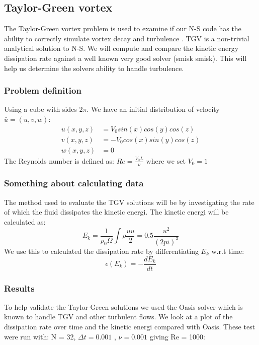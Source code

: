 \subsection{Taylor-Green vortex}
The Taylor-Green vortex problem is used to examine if our N-S code has the ability to correctly simulate vortex decay and turbulence \cite{DeBonis2013}. TGV is a non-trivial analytical  solution to N-S. We will compute and compare the kinetic energy dissipation rate against a well known very good solver (smisk smisk). This will help us determine the solvers ability to handle turbulence. 
\subsubsection{Problem definition}
Using a cube with sides $2\pi$. \newline
We have an initial distribution of velocity $\bar{u} = (u,v,w)$:
\begin{align}
u(x,y,z) &= V_0sin(x)cos(y)cos(z) \\
v(x,y,z) &= - V_0cos(x)sin(y)cos(z)  \\
w(x,y,z) &= 0  
\end{align}
The Reynolds number is defined as: $Re = \frac{V_0 L}{\nu}$ where we set $V_0 = 1$

\subsubsection*{Something about calculating data}
The method used to evaluate the TGV solutions will be by investigating the rate of which the fluid dissipates the kinetic energi. The kinetic energi will be calculated as:
$$        E_k = \frac{1}{\rho_0 \Omega}\int \rho \frac{uu}{2} = 0.5 \frac{u^2}{(2pi)^3}$$
We use this to calculated the dissipation rate by differentiating $E_k$ w.r.t time:
$$ \epsilon(E_k) = -\frac{d E_k}{dt}$$

\subsubsection*{Results}
To help validate the Taylor-Green solutions we used the Oasis solver \cite{Oasis} which is known to handle TGV and other turbulent flows. We look at a plot of the dissipation rate over time and the kinetic energi compared with Oasis. 
These test were run with: N = 32, $\Delta t = 0.001$ , $\nu = 0.001$ giving Re = 1000:

